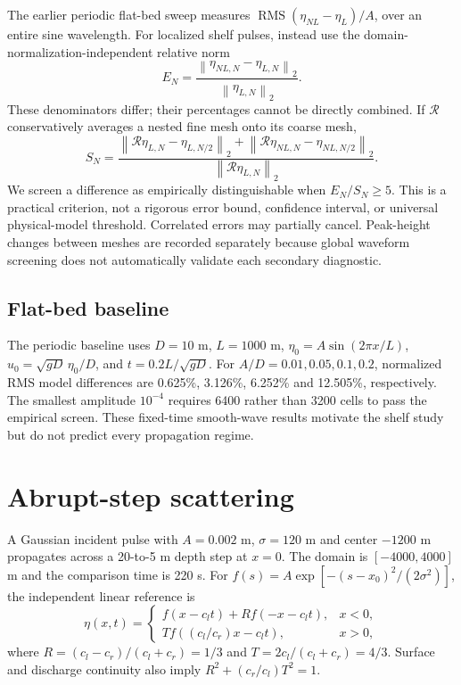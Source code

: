 \documentclass[11pt]{article}
\newcommand{\RMS}{\operatorname{RMS}}
\newcommand{\norm}[1]{\left\lVert #1\right\rVert_2}
\begin{document}
The earlier periodic flat-bed sweep measures
$\RMS(\eta_{NL}-\eta_L)/A$, over an entire sine wavelength.
For localized shelf pulses, instead use the domain-normalization-independent
relative norm
\begin{equation}
 E_N=\frac{\norm{\eta_{NL,N}-\eta_{L,N}}}{\norm{\eta_{L,N}}}.
 \label{eq:E}
\end{equation}
These denominators differ; their percentages cannot be directly combined.
If $\mathcal R$ conservatively averages a nested fine mesh onto its coarse mesh,
\begin{equation}
 S_N=\frac{\norm{\mathcal R\eta_{L,N}-\eta_{L,N/2}}
 +\norm{\mathcal R\eta_{NL,N}-\eta_{NL,N/2}}}
 {\norm{\mathcal R\eta_{L,N}}}. \label{eq:S}
\end{equation}
We screen a difference as empirically distinguishable when $E_N/S_N\geq5$.
This is a practical criterion, not a rigorous error bound, confidence interval,
or universal physical-model threshold. Correlated errors may partially cancel.
Peak-height changes between meshes are recorded separately because global
waveform screening does not automatically validate each secondary diagnostic.

\subsection{Flat-bed baseline}
The periodic baseline uses $D=10$ m, $L=1000$ m, $\eta_0=A\sin(2\pi x/L)$,
$u_0=\sqrt{gD}\,\eta_0/D$, and $t=0.2L/\sqrt{gD}$.
For $A/D=0.01,0.05,0.1,0.2$, normalized RMS model differences are
0.625\%, 3.126\%, 6.252\% and 12.505\%, respectively.
The smallest amplitude $10^{-4}$ requires 6400 rather than 3200 cells to pass
the empirical screen. These fixed-time smooth-wave results motivate the shelf
study but do not predict every propagation regime.

\section{Abrupt-step scattering}\label{sec:step}
A Gaussian incident pulse with $A=0.002$ m, $\sigma=120$ m and center
$-1200$ m propagates across a 20-to-5 m depth step at $x=0$.
The domain is $[-4000,4000]$ m and the comparison time is 220 s.
For $f(s)=A\exp[-(s-x_0)^2/(2\sigma^2)]$, the independent linear reference is
\begin{equation}
 \eta(x,t)=\begin{cases}
 f(x-c_lt)+R f(-x-c_lt),&x<0,\\
 T f((c_l/c_r)x-c_lt),&x>0,
 \end{cases}
\end{equation}
where $R=(c_l-c_r)/(c_l+c_r)=1/3$ and $T=2c_l/(c_l+c_r)=4/3$.
Surface and discharge continuity also imply
$R^2+(c_r/c_l)T^2=1$.
\end{document}
